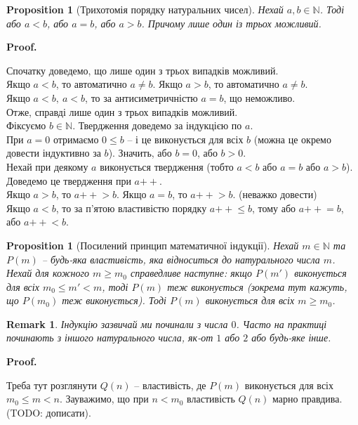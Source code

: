 \documentclass[a4paper, 14pt]{extarticle}
\makeatletter
\theoremstyle{theoremdd}
\theoremstyle{theoremdd}
\theoremstyle{theoremdd}
\theoremstyle{theoremdd}
\theoremstyle{theoremdd}
\theoremstyle{theoremdd}
\theoremstyle{theoremdd}
\theoremstyle{theoremdd}
\theoremstyle{theoremdd}
\theoremstyle{theoremdd}
\newtheorem{proposition}[theorem]{Proposition}
\theoremstyle{theoremdd}
\theoremstyle{theoremdd}
\newtheorem{remark}[theorem]{Remark}
\theoremstyle{theoremdd}
\theoremstyle{theoremdd}
\theoremstyle{theoremdd}
\theoremstyle{theoremdd}
\renewenvironment{proof}[1][Proof.\\]{\par
\pushQED{\hfill \qed}%
\normalfont \topsep6\p@\@plus6\p@\relax
\trivlist
\item\relax
{\bfseries
#1\@addpunct{.}}\hspace\labelsep\ignorespaces
}{%
\popQED\endtrivlist\@endpefalse
}
\newcommand{\plusplus}{\!\!\mathrel{++}}
\makeatother
\begin{document}
\begin{proposition}[Трихотомія порядку натуральних чисел]
Нехай $a,b \in \mathbb{N}$. Тоді або $a < b$, або $a = b$, або $a > b$. Причому лише один із трьох можливий.
\end{proposition}

\begin{proof}
Спочатку доведемо, що лише один з трьох випадків можливий.\\
Якщо $a < b$, то автоматично $a \neq b$. Якщо $a > b$, то автоматично $a \neq b$.\\
Якщо $a < b,\ a < b$, то за антисиметричністю $a = b$, що неможливо.\\
Отже, справді лише один з трьох випадків можливий.
\bigskip \\
Фіксуємо $b \in \mathbb{N}$. Твердження доведемо за індукцією по $a$.\\
При $a = 0$ отримаємо $0 \leq b$ -- і це виконується для всіх $b$ (можна це окремо довести індуктивно за $b$). Значить, або $b = 0$, або $b > 0$.\\
Нехай при деякому $a$ виконується твердження (тобто $a < b$ або $a = b$ або $a > b$). Доведемо це твердження при $a \plusplus$.\\
Якщо $a > b$, то $a\plusplus > b$. Якщо $a = b$, то $a \plusplus > b$. (неважко довести)\\
Якщо $a < b$, то за п'ятою властивістю порядку $a \plusplus \leq b$, тому або $a \plusplus = b$, або $a \plusplus < b$.
\end{proof}

\begin{proposition}[Посилений принцип математичної індукції]
Нехай $m \in \mathbb{N}$ та $P(m)$ -- будь-яка властивість, яка відноситься до натурального числа $m$. Нехай для кожного $m \geq m_0$ справедливе наступне: якщо $P(m')$ виконується для всіх $m_0 \leq m' < m$, тоді $P(m)$ теж виконується (зокрема тут кажуть, що $P(m_0)$ теж виконується). Тоді $P(m)$ виконується для всіх $m \geq m_0$. 
\end{proposition}

\begin{remark}
Індукцію зазвичай ми починали з числа $0$. Часто на практиці починають з іншого натурального числа, як-от $1$ або $2$ або будь-яке інше.
\end{remark}

\begin{proof}
Треба тут розглянути $Q(n)$ -- властивість, де $P(m)$ виконується для всіх $m_0 \leq m < n$. Зауважимо, що при $n < m_0$ властивість $Q(n)$ марно правдива. (TODO: дописати).
\end{proof}
\end{document}
